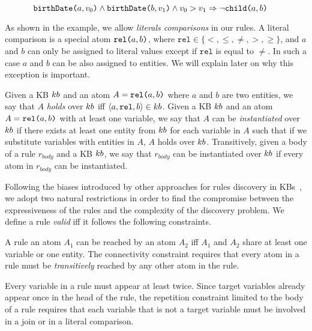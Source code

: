 		\vspace{-3.5ex}
{\small	
\begin{equation*}
		 \hspace*{-0.45cm}   \atom{birthDate}{a}{v_0} \wedge \atom{birthDate}{b}{v_1} \wedge v_0 > v_1
		\Rightarrow  \neg \atom{child}{a}{b}  
	\end{equation*}
}
	\vspace{-2.5ex}

As shown in the example, we allow \emph{literals comparisons} in our rules. A literal comparison is a special atom $\texttt{rel(}a,b\texttt{)}$, where $\texttt{rel} \in \{<,\leq,\neq,>,\geq\}$, and $a$ and $b$ can only be assigned to literal values except if $\texttt{rel}$ is equal to $\neq$. In such a case $a$ and $b$ can be also assigned to entities. We will explain later on why this exception is important.

Given a KB ${\sc kb}$ and an atom $A=\texttt{rel(}a,b\texttt{)}$ where $a$ and $b$ are two entities, we say that $A$ \emph{holds} over ${\sc kb}$ iff $\langle a,\texttt{rel},b\rangle \in {\sc kb}$.
Given a KB ${\sc kb}$ and an atom $A=\texttt{rel(}a,b\texttt{)}$ with at least one variable, we say that $A$ can be \emph{instantiated} over ${\sc kb}$ if there exists at least one entity from ${\sc kb}$ for each variable in $A$ such that if we substitute variables with entities in $A$, $A$ holds over ${\sc kb}$. Transitively, given a body of a rule $r_{body}$ and a KB ${\sc kb}$, we say that $r_{body}$ can be instantiated over ${\sc kb}$ if every atom in $r_{body}$ can be instantiated. 

Following the biases introduced by other approaches for rules discovery in KBs~\cite{galarraga2015fast,Chen:2016}, we adopt two natural restrictions in order to find the compromise between the expressiveness of the rules and the complexity of the discovery problem. We define a rule \emph{valid} iff it follows the following constraints.

\vspace{1ex}
 A rule an atom $A_1$ can be reached by an atom $A_2$ iff $A_1$ and $A_2$ share at least one variable or one entity. The connectivity constraint requires that every atom in a rule must be \emph{transitively} reached by any other atom in the rule.

\vspace{1ex}
 Every variable in a rule must appear at least twice. Since target variables already appear once in the head of the rule, the repetition constraint limited to the body of a rule requires that each variable that is not a target variable must be involved in a join or in a literal comparison.

